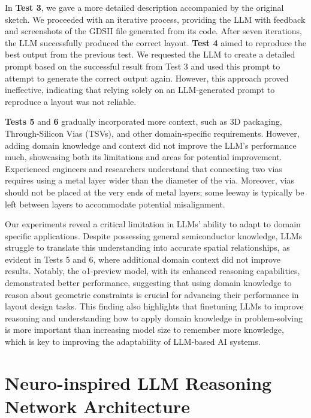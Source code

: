 \documentclass{article}
\begin{document}
In \textbf{Test 3}, we gave a more detailed description accompanied by the original sketch. We proceeded with an iterative process, providing the LLM with feedback and screenshots of the GDSII file generated from its code. After seven iterations, the LLM successfully produced the correct layout. \textbf{Test 4} aimed to reproduce the best output from the previous test. We requested the LLM to create a detailed prompt based on the successful result from Test 3 and used this prompt to attempt to generate the correct output again. However, this approach proved ineffective, indicating that relying solely on an LLM-generated prompt to reproduce a layout was not reliable.

\textbf{Tests 5} and \textbf{6} gradually incorporated more context, such as 3D packaging, Through-Silicon Vias (TSVs), and other domain-specific requirements. However, adding domain knowledge and context did not improve the LLM's performance much, showcasing both its limitations and areas for potential improvement.  Experienced engineers and researchers understand that connecting two vias requires using a metal layer wider than the diameter of the via. Moreover, vias should not be placed at the very ends of metal layers; some leeway is typically be left between layers to accommodate potential misalignment. %

Our experiments reveal a critical limitation in LLMs' ability to adapt to domain specific applications. Despite possessing general semiconductor knowledge, LLMs struggle to translate this understanding into accurate spatial relationships, as evident in Tests 5 and 6, where additional domain context did not improve results. Notably, the o1-preview model, with its enhanced reasoning capabilities, demonstrated better performance, suggesting that using domain knowledge to reason about geometric constraints is crucial for advancing their performance in layout design tasks. This finding also highlights that finetuning LLMs to improve reasoning and understanding how to apply domain knowledge in problem-solving is more important than increasing model size to remember more knowledge, which is key to improving the adaptability of LLM-based AI systems.

\section{Neuro-inspired LLM Reasoning Network Architecture}
\end{document}
